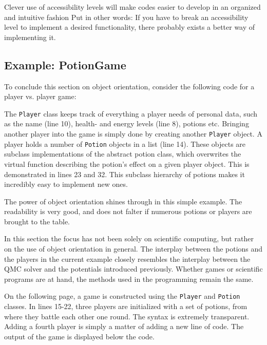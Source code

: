 Clever use of accessibility levels will make codes easier to develop in an organized and intuitive fashion Put in other words: If you have to break an accessibility level to implement a desired functionality, there probably exists a better way of implementing it.


\subsection{Example: PotionGame}
\label{sec:PotionGame}

To conclude this section on object orientation, consider the following code for a player vs. player game:
\clearpage

\vspace{0.5 cm}

\clearpage


The \verb+Player+ class keeps track of everything a player needs of personal data, such as the name (line 10), health- and  energy levels (line 8), potions etc. Bringing another player into the game is simply done by creating another \verb+Player+ object. A player holds a number of \verb+Potion+ objects in a list (line 14). These objects are subclass implementations of the abstract potion class, which overwrites the virtual function describing the potion's effect on a given player object. This is demonstrated in lines 23 and 32. This subclass hierarchy of potions makes it incredibly easy to implement new ones.

The power of object orientation shines through in this simple example. The readability is very good, and does not falter if numerous potions or players are brought to the table.

In this section the focus has not been solely on scientific computing, but rather on the use of object orientation in general. The interplay between the potions and the players in the current example closely resembles the interplay between the QMC solver and the potentials introduced previously. Whether games or scientific programs are at hand, the methods used in the programming remain the same. 

On the following page, a game is constructed using the \verb+Player+ and \verb+Potion+ classes. In lines 15-22, three players are initialized with a set of potions, from where they battle each other one round. The syntax is extremely transparent. Adding a fourth player is simply a matter of adding a new line of code. The output of the game is displayed below the code. 
 
